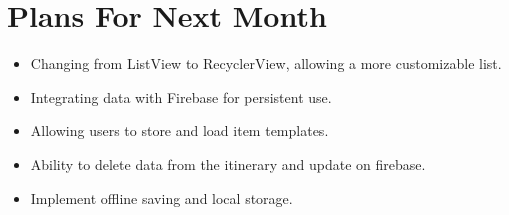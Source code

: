 \documentclass[12pt]{article}
\begin{document}
	\section*{Plans For Next Month}
	\begin{itemize}
		\item Changing from ListView to RecyclerView, allowing a more customizable list.
		\item Integrating data with Firebase for persistent use.
		\item Allowing users to store and load item templates.
		\item Ability to delete data from the itinerary and update on firebase.
		\item Implement offline saving and local storage.
	\end{itemize}
\end{document}
